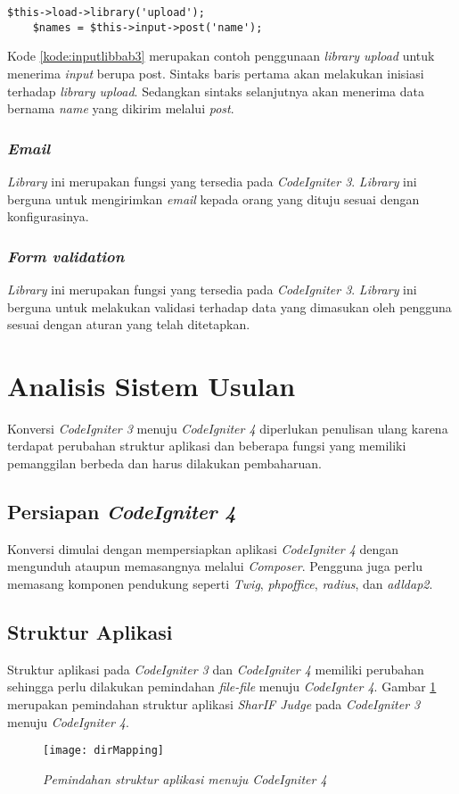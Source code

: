 \begin{lstlisting}[caption=Contoh penggunaan \textit{library input}, label=kode:inputlibbab3]
	$this->load->library('upload');
	$names = $this->input->post('name');
\end{lstlisting}

Kode \ref{kode:inputlibbab3} merupakan contoh penggunaan \textit{library upload} untuk menerima \textit{input} berupa post. Sintaks baris pertama akan melakukan inisiasi terhadap \textit{library upload}. Sedangkan sintaks selanjutnya akan menerima data bernama \textit{name} yang dikirim melalui \textit{post}.

\subsubsection{\textit{Email}}
\textit{Library} ini merupakan fungsi yang tersedia pada \textit{CodeIgniter 3}. \textit{Library} ini berguna untuk mengirimkan \textit{email} kepada orang yang dituju sesuai dengan konfigurasinya.

\subsubsection{\textit{Form validation}}
\textit{Library} ini merupakan fungsi yang tersedia pada \textit{CodeIgniter 3}. \textit{Library} ini berguna untuk melakukan validasi terhadap data yang dimasukan oleh pengguna sesuai dengan aturan yang telah ditetapkan.

\section{Analisis Sistem Usulan}
Konversi \textit{CodeIgniter 3} menuju \textit{CodeIgniter 4} diperlukan penulisan ulang karena terdapat perubahan struktur aplikasi dan beberapa fungsi yang memiliki pemanggilan berbeda dan harus dilakukan pembaharuan.
\subsection{Persiapan \textit{CodeIgniter 4}} Konversi dimulai dengan mempersiapkan aplikasi \textit{CodeIgniter 4} dengan mengunduh ataupun memasangnya melalui \textit{Composer}. Pengguna juga perlu memasang komponen pendukung seperti \textit{Twig}, \textit{phpoffice}, \textit{radius}, dan \textit{adldap2}.

\subsection{Struktur Aplikasi}
Struktur aplikasi pada \textit{CodeIgniter 3} dan \textit{CodeIgniter 4} memiliki perubahan sehingga perlu dilakukan pemindahan \textit{file-file} menuju \textit{CodeIgnter 4}. Gambar \ref{fig:dirMapping} merupakan pemindahan struktur aplikasi \textit{SharIF Judge} pada \textit{CodeIgniter 3} menuju \textit{CodeIgniter 4}.
\begin{figure}[H]
	\centering  
	\texttt{[image: dirMapping]}  
	\caption[\textit{Pemindahan struktur aplikasi menuju \textit{CodeIgniter 4}}]{\textit{Pemindahan struktur aplikasi menuju \textit{CodeIgniter 4}}} 
	\label{fig:dirMapping} 
\end{figure} 

